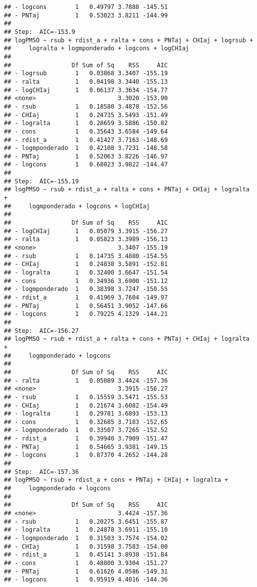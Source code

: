 \documentclass[
]{article}
\begin{document}
\begin{verbatim}
## - logcons        1   0.49797 3.7888 -145.51
## - PNTaj          1   0.53023 3.8211 -144.99
## 
## Step:  AIC=-153.9
## logPMSO ~ rsub + rdist_a + ralta + cons + PNTaj + CHIaj + logrsub + 
##     logralta + logmponderado + logcons + logCHIaj
## 
##                 Df Sum of Sq    RSS     AIC
## - logrsub        1   0.03868 3.3407 -155.19
## - ralta          1   0.04198 3.3440 -155.13
## - logCHIaj       1   0.06137 3.3634 -154.77
## <none>                       3.3020 -153.90
## - rsub           1   0.18580 3.4878 -152.56
## - CHIaj          1   0.24735 3.5493 -151.49
## - logralta       1   0.28659 3.5886 -150.82
## - cons           1   0.35643 3.6584 -149.64
## - rdist_a        1   0.41427 3.7163 -148.69
## - logmponderado  1   0.42108 3.7231 -148.58
## - PNTaj          1   0.52063 3.8226 -146.97
## - logcons        1   0.68023 3.9822 -144.47
## 
## Step:  AIC=-155.19
## logPMSO ~ rsub + rdist_a + ralta + cons + PNTaj + CHIaj + logralta + 
##     logmponderado + logcons + logCHIaj
## 
##                 Df Sum of Sq    RSS     AIC
## - logCHIaj       1   0.05079 3.3915 -156.27
## - ralta          1   0.05823 3.3989 -156.13
## <none>                       3.3407 -155.19
## - rsub           1   0.14735 3.4880 -154.55
## - CHIaj          1   0.24838 3.5891 -152.81
## - logralta       1   0.32400 3.6647 -151.54
## - cons           1   0.34936 3.6900 -151.12
## - logmponderado  1   0.38398 3.7247 -150.55
## - rdist_a        1   0.41969 3.7604 -149.97
## - PNTaj          1   0.56451 3.9052 -147.66
## - logcons        1   0.79225 4.1329 -144.21
## 
## Step:  AIC=-156.27
## logPMSO ~ rsub + rdist_a + ralta + cons + PNTaj + CHIaj + logralta + 
##     logmponderado + logcons
## 
##                 Df Sum of Sq    RSS     AIC
## - ralta          1   0.05089 3.4424 -157.36
## <none>                       3.3915 -156.27
## - rsub           1   0.15559 3.5471 -155.53
## - CHIaj          1   0.21674 3.6082 -154.49
## - logralta       1   0.29781 3.6893 -153.13
## - cons           1   0.32685 3.7183 -152.65
## - logmponderado  1   0.33507 3.7265 -152.52
## - rdist_a        1   0.39940 3.7909 -151.47
## - PNTaj          1   0.54665 3.9381 -149.15
## - logcons        1   0.87370 4.2652 -144.28
## 
## Step:  AIC=-157.36
## logPMSO ~ rsub + rdist_a + cons + PNTaj + CHIaj + logralta + 
##     logmponderado + logcons
## 
##                 Df Sum of Sq    RSS     AIC
## <none>                       3.4424 -157.36
## - rsub           1   0.20275 3.6451 -155.87
## - logralta       1   0.24878 3.6911 -155.10
## - logmponderado  1   0.31503 3.7574 -154.02
## - CHIaj          1   0.31598 3.7583 -154.00
## - rdist_a        1   0.45141 3.8938 -151.84
## - cons           1   0.48800 3.9304 -151.27
## - PNTaj          1   0.61626 4.0586 -149.31
## - logcons        1   0.95919 4.4016 -144.36
\end{verbatim}
\end{document}
